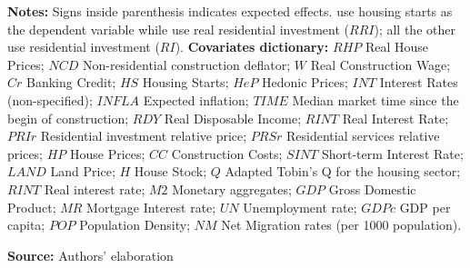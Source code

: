 \begin{table}[htb]
\begin{threeparttable}
    \footnotesize{\textbf{Notes:} Signs inside parenthesis indicates expected effects. \textcite{topel_1988_Housing} use housing starts as the dependent variable while \textcite{arestis_residential_2015} use real residential investment ($RRI$); all the other use residential investment ($RI$). \textbf{Covariates dictionary:} $RHP$ Real House Prices; $NCD$ Non-residential construction deflator; $W$ Real Construction Wage; $Cr$ Banking Credit; $HS$ Housing Starts; $HeP$ Hedonic Prices; $INT$ Interest Rates (non-specified); $INFLA$ Expected inflation; $TIME$ Median market time since the begin of construction; $RDY$ Real Disposable Income; $RINT$ Real Interest Rate; $PRIr$ Residential investment relative price; $PRSr$ Residential services relative prices; $HP$ House Prices; $CC$ Construction Costs; $SINT$ Short-term Interest Rate; $LAND$ Land Price; $H$ House Stock; $Q$ Adapted Tobin's Q for the housing sector; $RINT$ Real interest rate; $M2$ Monetary aggregates; $GDP$ Gross Domestic Product; $MR$ Mortgage Interest rate; $UN$ Unemployment rate; $GDPc$ GDP per capita; $POP$ Population Density; $NM$ Net Migration rates (per 1000 population).}
  \end{threeparttable}
    \caption*{\textbf{Source:} Authors' elaboration}
\end{table}
